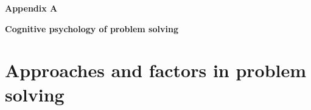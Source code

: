\begin{center}
\textbf{\fontsize{16}{32}\selectfont Appendix A}

\textbf{\fontsize{16}{32}\selectfont Cognitive psychology of problem solving}
\end{center}

\hspace{2em} \blindtext
\section*{Approaches and factors in problem solving}

\hspace{2em} \Blindtext